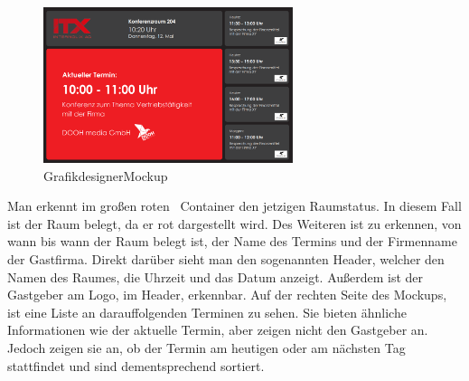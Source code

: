 \newline
\begin{figure}[hbt!]
\par\vspace{1cm}
\centering
\includegraphics[width=0.65\textwidth]{Bilder/GrafikdesignerMockup}
\caption{GrafikdesignerMockup}
\label{fig:GrafikdesignerMockup}
\par\vspace{1cm}
\end{figure}
\justifying
\pagebreak
{}
Man erkennt im großen roten ~\gls{Container} den jetzigen Raumstatus.
In diesem Fall ist der Raum belegt, da er rot dargestellt wird.
Des Weiteren ist zu erkennen, von wann bis wann der Raum belegt ist, der Name des Termins und der Firmenname der Gastfirma.
\newline
{}
Direkt darüber sieht man den sogenannten \gls{Header}, welcher den Namen des Raumes, die Uhrzeit und das Datum anzeigt.
Außerdem ist der Gastgeber am Logo, im Header, erkennbar.
\newline
Auf der rechten Seite des Mockups, ist eine Liste an darauffolgenden Terminen zu sehen.
Sie bieten ähnliche Informationen wie der aktuelle Termin, aber zeigen nicht den Gastgeber an.
Jedoch zeigen sie an, ob der Termin am heutigen oder am nächsten Tag stattfindet und sind dementsprechend sortiert.
\newline
\newline

